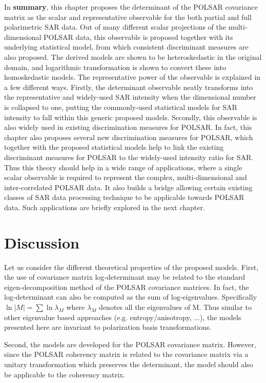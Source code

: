 In \textbf{summary}, this chapter proposes the determinant of the POLSAR covariance matrix as the scalar and representative observable for the both partial and full polarimetric SAR data.
Out of many different scalar projections of the multi-dimensional POLSAR data, this observable is proposed together with its underlying statistical model, from which consistent discriminant measures are also proposed.
The derived models are shown to be heteroskedastic in the original domain, and logarithmic transformation is shown to convert these into homoskedastic models.
The representative power of the observable is explained in a few different ways.
Firstly, the determinant observable neatly transforms into the representative and widely-used SAR intensity when the dimensional number is collapsed to one, putting the commonly-used statistical models for SAR intensity to fall within this generic proposed models.
Secondly, this observable is also  widely used in existing discrimination measures for POLSAR.
In fact, this chapter also proposes several new discrimination measures for POLSAR,
  which together with the proposed statistical models help to link the existing discriminant measures for POLSAR to the widely-used intensity ratio for SAR.
Thus this theory should help in a wide range of applications, where a single scalar observable is required to represent the complex, multi-dimensional and inter-correlated POLSAR data.
It also builds a bridge allowing  certain existing classes of SAR data processing technique to be applicable towards POLSAR data.
Such applications are briefly explored in the next chapter. 

\section{Discussion}

Let us consider the different theoretical properties of the proposed models.
First, the use of covariance matrix log-determinant may be related to the standard eigen-decomposition method of the POLSAR covariance matrices.
In fact, the log-determinant can also be computed as the sum of log-eigenvalues.
Specifically $\ln{|M|} = \sum \ln{\lambda_M}$ where $\lambda_M$ denotes all the eigenvalues of M.
Thus similar to other eigenvalue based approaches (e.g. entropy/anisotropy, ...),
  the models presented here are invariant to polarization basis transformations.

Second, the models are developed for the POLSAR covariance matrix.
However, since the POLSAR coherency matrix is related to the covariance matrix via a unitary transformation which preserves the determinant,
  the model should also be applicable to the coherency matrix.

